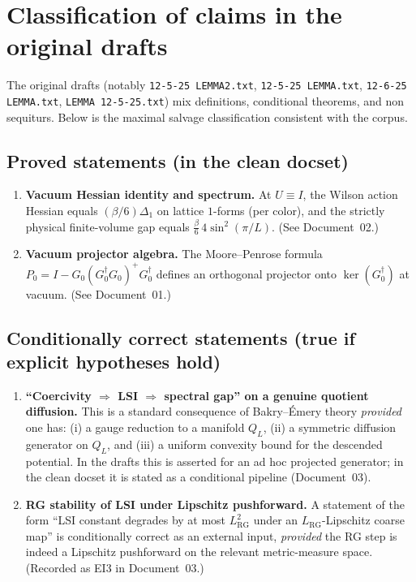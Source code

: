 \documentclass[11pt]{article}
\begin{document}
\section{Classification of claims in the original drafts}

The original drafts (notably \texttt{12-5-25 LEMMA2.txt}, \texttt{12-5-25 LEMMA.txt}, \texttt{12-6-25 LEMMA.txt}, \texttt{LEMMA 12-5-25.txt}) mix definitions, conditional theorems, and non sequiturs.
Below is the maximal salvage classification consistent with the corpus.

\subsection*{Proved statements (in the clean docset)}
\begin{enumerate}[leftmargin=*]
\item \textbf{Vacuum Hessian identity and spectrum.}
At $U\equiv I$, the Wilson action Hessian equals $(\beta/6)\Delta_1$ on lattice $1$-forms (per color),
and the strictly physical finite-volume gap equals $\frac{\beta}{6}\,4\sin^2(\pi/L)$.
(See Document~02.)

\item \textbf{Vacuum projector algebra.}
The Moore--Penrose formula
$P_0 = I - G_0(G_0^\dagger G_0)^+G_0^\dagger$
defines an orthogonal projector onto $\ker(G_0^\dagger)$ at vacuum.
(See Document~01.)
\end{enumerate}

\subsection*{Conditionally correct statements (true if explicit hypotheses hold)}
\begin{enumerate}[leftmargin=*]
\item \textbf{``Coercivity $\Rightarrow$ LSI $\Rightarrow$ spectral gap'' on a genuine quotient diffusion.}
This is a standard consequence of Bakry--\'Emery theory \emph{provided} one has:
(i) a gauge reduction to a manifold $Q_L$,
(ii) a symmetric diffusion generator on $Q_L$,
and (iii) a uniform convexity bound for the descended potential.
In the drafts this is asserted for an ad hoc projected generator; in the clean docset it is stated as a conditional pipeline (Document~03).

\item \textbf{RG stability of LSI under Lipschitz pushforward.}
A statement of the form ``LSI constant degrades by at most $L_{\mathrm{RG}}^2$ under an $L_{\mathrm{RG}}$-Lipschitz coarse map''
is conditionally correct as an external input, \emph{provided} the RG step is indeed a Lipschitz pushforward on the relevant metric-measure space.
(Recorded as EI3 in Document~03.)
\end{enumerate}
\end{document}
